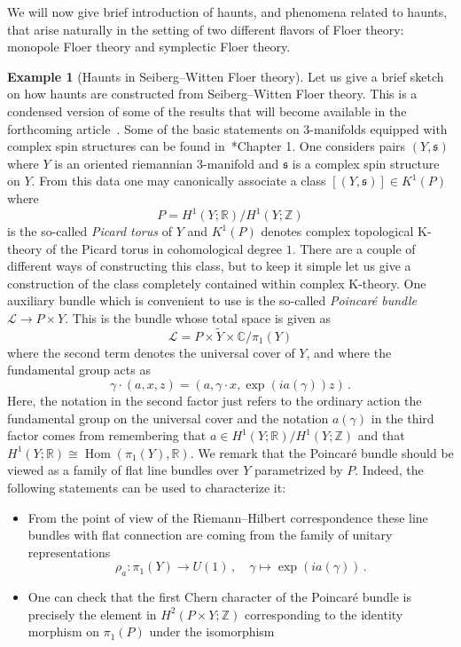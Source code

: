 \documentclass[10pt]{amsart}
\newcommand{\longto}{\longrightarrow}
\theoremstyle{plain}
\theoremstyle{definition}
\newtheorem{example}[theorem]{Example}
\DeclareMathOperator{\Hom}{Hom}
\newcommand{\bC}{\mathbb{C}}
\newcommand{\bR}{\mathbb{R}}
\newcommand{\bZ}{\mathbb{Z}}
\begin{document}
We will now give brief introduction of haunts, and phenomena related to haunts, that arise naturally in the setting of two different flavors of Floer theory: monopole Floer theory and symplectic Floer theory.

\begin{example}[Haunts in Seiberg--Witten Floer theory] \label{ex:SWF}
Let us give a brief sketch on how haunts are constructed from Seiberg--Witten Floer theory.
This is a condensed version of some of the results that will become available in the forthcoming article~\cite{BHK}.
Some of the basic statements on 3-manifolds equipped with complex spin structures can be found in~\cite{KM07}*{Chapter 1}.
One considers pairs $(Y,\mathfrak{s})$ where $Y$ is an oriented riemannian 3-manifold and $\mathfrak{s}$ is a complex spin structure on $Y$.
From this data one may canonically associate a class $[(Y,\mathfrak{s})] \in K^1(P)$ where
\[
P = H^1(Y;\bR)/H^1(Y;\bZ)
\]
is the so-called \emph{Picard torus} of $Y$ and $K^1(P)$ denotes complex topological K-theory of the Picard torus in cohomological degree $1$.
There are a couple of different ways of constructing this class, but to keep it simple let us give a construction of the class completely contained within complex K-theory.
One auxiliary bundle which is convenient to use is the so-called \emph{Poincaré bundle} $\mathcal{L} \to P \times Y$.
This is the bundle whose total space is given as
\[
\mathcal{L} = P \times \widetilde{Y} \times \bC / \pi_1(Y)
\]
where the second term denotes the universal cover of $Y$, and where the fundamental group acts as
\[
\gamma \cdot (a,x,z) = (a,\gamma \cdot x , \exp(ia(\gamma))z) \,.
\]
Here, the notation in the second factor just refers to the ordinary action the fundamental group on the universal cover and the notation $a(\gamma)$ in the third factor comes from remembering that $a \in H^1(Y;\bR)/H^1(Y;\bZ)$ and that $H^1(Y;\bR) \cong \Hom(\pi_1(Y),\bR)$.
We remark that the Poincaré bundle should be viewed as a family of flat line bundles over $Y$ parametrized by $P$. Indeed, the following statements can be used to characterize it:
\begin{itemize}
  \item From the point of view of the Riemann--Hilbert correspondence these line bundles with flat connection are coming from the family of unitary representations
  \[
  \rho_a : \pi_1(Y) \longto U(1) \,, \quad \gamma \mapsto \exp(ia(\gamma)) \,.
  \]
  \item One can check that the first Chern character of the Poincaré bundle is precisely the element in $H^2(P \times Y ;\bZ)$ corresponding to the identity morphism on $\pi_1(P)$ under the isomorphism

\end{itemize}
\end{example}
\end{document}
